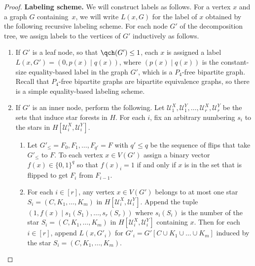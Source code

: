 \documentclass{article}
\newcommand\eqLabelSep{\mathbin|}
\newcommand{\zo}{\{0,1\}}
\newcommand{\cU}{\ensuremath{\mathcal{U}}}
\begin{document}
\begin{proof}
\noindent\textbf{Labeling scheme.}
We will construct labels as follows. For a vertex $x$ and a graph $G$ containing~$x$, we will write
$L(x,G)$ for the label of $x$ obtained by the following recursive labeling scheme. For each node
$G'$ of the decomposition tree, we assign labels to the vertices of $G'$ inductively as follows.
\begin{enumerate}[topsep=4pt,parsep=0pt,partopsep=0pt]
\item If $G'$ is a leaf node, so that $\qch(G') \leq 1$, each $x$ is assigned a label $L(x,G') =
(0,p(x) \eqLabelSep q(x))$, where $(p(x) \eqLabelSep q(x))$ is the constant-size equality-based label in the graph
$G'$, which is a $P_4$-free bipartite graph. Recall that $P_4$-free bipartite graphs are bipartite
equivalence graphs, so there is a simple equality-based labeling scheme.
\item If $G'$ is an inner node, perform the following. Let $\cU^X_1,\cU^Y_1, \dotsc, \cU^X_r,\cU^Y_r$ be the sets that
induce star forests in $H$. For each $i$, fix an arbitrary numbering $s_i$ to the stars 
in $H[\cU^X_i,\cU^Y_i]$.
\begin{enumerate}[itemsep=0pt,topsep=4pt,partopsep=0pt]
\item Let $G'_\leq = F_0, F_1, \dotsc, F_{q'} = F$ with $q' \leq q$ be the sequence of flips that
take $G'_\leq$ to $F$. To each vertex $x \in V(G')$ assign a binary vector $f(x) \in \zo^q$ so that
$f(x)_i = 1$ if and only if $x$ is in the set that is flipped to get $F_i$ from $F_{i-1}$.
\item For each $i \in [r]$, any vertex $x \in V(G')$ belongs to at most one star $S_i = (C, K_1,
\dotsc, K_m)$ in $H[\cU^X_i,\cU^Y_i]$. Append the tuple $(1, f(x) \mathbin| s_1(S_1), \dotsc, s_r(S_r))$ where
$s_i(S_i)$ is the number of the star $S_i = (C, K_1, \dotsc, K_m)$ in $H[\cU^X_i,\cU^Y_i]$ containing $x$.
Then for each $i \in [r]$, append $L(x, G'_i)$ for $G'_i = G'[C \cup K_1 \cup \dotsc \cup K_m]$
induced by the star $S_i = (C,K_1, \dotsc, K_m)$.
\label{step:star}
\end{enumerate}
\end{enumerate}


\end{proof}
\end{document}
